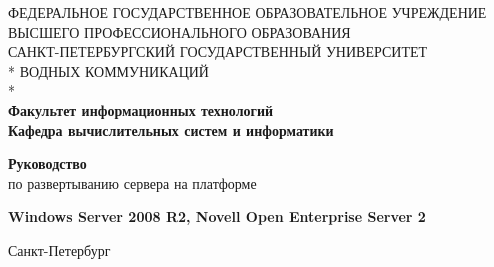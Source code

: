 {
\thispagestyle{empty}
\newpage

\begin{center}
ФЕДЕРАЛЬНОЕ ГОСУДАРСТВЕННОЕ ОБРАЗОВАТЕЛЬНОЕ УЧРЕЖДЕНИЕ ВЫСШЕГО ПРОФЕССИОНАЛЬНОГО ОБРАЗОВАНИЯ \\
\vspace{1cm}
САНКТ-ПЕТЕРБУРГСКИЙ ГОСУДАРСТВЕННЫЙ УНИВЕРСИТЕТ \\*
ВОДНЫХ КОММУНИКАЦИЙ \\*
\hrulefill\\
\textbf{Факультет информационных технологий \\
Кафедра вычислительных систем и информатики \\}
\end{center}

\vfill

\begin{center}
\textbf{Руководство}\\
\medskip
по развертыванию сервера на платформе\\
\medskip
\end{center}

\begin{center}
\textbf{Windows Server 2008 R2, Novell Open Enterprise Server 2}\\
\end{center}

\vfill
\vfill

\begin{center}
Санкт-Петербург \number\year
\end{center}
\clearpage

}